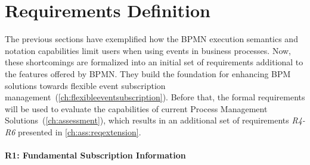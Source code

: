 \section{Requirements Definition}\label{ch:requirements}
The previous sections have exemplified how the BPMN execution semantics and notation capabilities limit users when using events in business processes. 
Now, these shortcomings are formalized into an initial set of requirements additional to the features offered by BPMN.
They build the foundation for enhancing BPM solutions towards flexible event subscription management~(\autoref{ch:flexibleeventsubscription}).
Before that, the formal requirements will be used to evaluate the capabilities of current Process Management Solutions~(\autoref{ch:assessment}), which results in an additional set of requirements \textit{R4-R6} presented in \autoref{ch:ass:reqextension}.





\paragraph{R1: Fundamental Subscription Information}

